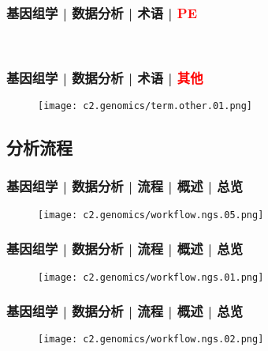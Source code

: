 \begin{frame}
  \frametitle{基因组学 | 数据分析 | 术语 | \textcolor{red}{PE}}
  \begin{figure}
    \centering
    \\
    \vspace{1em}
  \end{figure}
\end{frame}

\begin{frame}
  \frametitle{基因组学 | 数据分析 | 术语 | \textcolor{red}{其他}}
  \begin{figure}
    \centering
    \texttt{[image: c2.genomics/term.other.01.png]}
  \end{figure}
\end{frame}

\subsection{分析流程}
\begin{frame}
  \frametitle{基因组学 | 数据分析 | 流程 | 概述 | 总览}
  \begin{figure}
    \centering
    \texttt{[image: c2.genomics/workflow.ngs.05.png]}
  \end{figure}
\end{frame}

\begin{frame}
  \frametitle{基因组学 | 数据分析 | 流程 | 概述 | 总览}
  \begin{figure}
    \centering
    \texttt{[image: c2.genomics/workflow.ngs.01.png]}
  \end{figure}
\end{frame}

\begin{frame}
  \frametitle{基因组学 | 数据分析 | 流程 | 概述 | 总览}
  \begin{figure}
    \centering
    \texttt{[image: c2.genomics/workflow.ngs.02.png]}
  \end{figure}
\end{frame}

